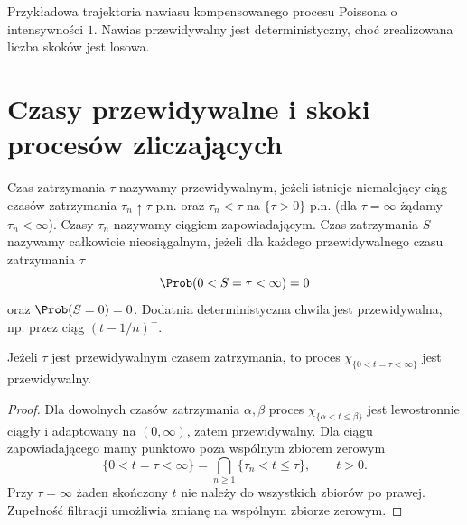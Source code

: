 \begin{center}
\par\smallskip\small Przykładowa trajektoria nawiasu
kompensowanego procesu Poissona o intensywności $1$.
Nawias przewidywalny jest deterministyczny, choć
zrealizowana liczba skoków jest losowa.
\end{center}

\section{Czasy przewidywalne i skoki procesów zliczających}

\begin{definicja}
Czas zatrzymania $\tau$ nazywamy przewidywalnym,
jeżeli istnieje niemalejący ciąg czasów zatrzymania
$\tau_n\uparrow\tau$ p.n. oraz $\tau_n<\tau$
na $\{\tau>0\}$ p.n. (dla $\tau=\infty$
żądamy $\tau_n<\infty$).
Czasy $\tau_n$ nazywamy ciągiem zapowiadającym.
Czas zatrzymania $S$ nazywamy całkowicie
nieosiągalnym, jeżeli dla każdego
przewidywalnego czasu zatrzymania $\tau$
\[
\Prob(0<S=\tau<\infty)=0
\]
oraz $\Prob(S=0)=0$.
Dodatnia deterministyczna chwila jest
przewidywalna, np. przez ciąg $(t-1/n)^+$.
\end{definicja}

\begin{lemat}
\label{lem:predictable-time-graph}
Jeżeli $\tau$ jest przewidywalnym czasem zatrzymania,
to proces $\chi_{\{0<t=\tau<\infty\}}$
jest przewidywalny.
\end{lemat}
\begin{proof}
Dla dowolnych czasów zatrzymania $\alpha,\beta$
proces $\chi_{\{\alpha<t\le\beta\}}$
jest lewostronnie ciągły i adaptowany
na $(0,\infty)$, zatem przewidywalny.
Dla ciągu zapowiadającego mamy punktowo
poza wspólnym zbiorem zerowym
\[
\{0<t=\tau<\infty\}
=\bigcap_{n\ge1}\{\tau_n<t\le\tau\},
\qquad t>0.
\]
Przy $\tau=\infty$ żaden skończony $t$
nie należy do wszystkich zbiorów po prawej.
Zupełność filtracji umożliwia zmianę
na wspólnym zbiorze zerowym.
\end{proof}

